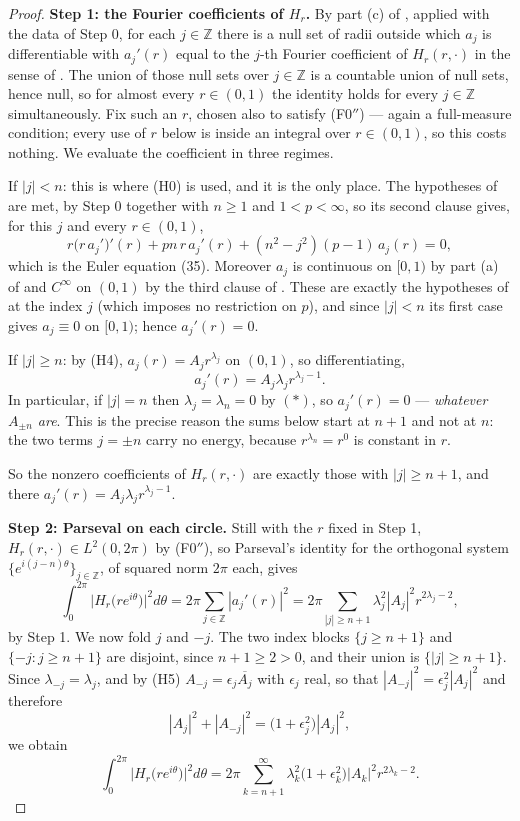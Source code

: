 \begin{proof}
\medskip\noindent\textbf{Step 1: the Fourier coefficients of $H_r$.}
By part (c) of , applied with the data of
Step 0, for each $j\in\mathbb{Z}$ there is a null set of radii outside which
$a_j$ is differentiable with $a_j'(r)$ equal to the $j$-th Fourier coefficient
of $H_r(r,\cdot)$ in the sense of .  The union of
those null sets over $j\in\mathbb{Z}$ is a countable union of null sets, hence
null, so for almost every $r\in(0,1)$ the identity holds for every
$j\in\mathbb{Z}$ simultaneously.  Fix such an $r$, chosen also to satisfy
(F0$''$) --- again a full-measure condition; every use of $r$ below is inside
an integral over $r\in(0,1)$, so this costs nothing.
We evaluate the coefficient in three regimes.

If $|j|<n$: this is where (H0) is used, and it is the only place.  The
hypotheses of  are met, by Step 0 together with
$n\ge1$ and $1<p<\infty$, so its second clause gives,
for this $j$ and every $r\in(0,1)$,
\[
  r\bigl(r\,a_j'\bigr)'(r)+pn\,r\,a_j'(r)+(n^2-j^2)(p-1)\,a_j(r)=0,
\]
which is the Euler equation (35).  Moreover $a_j$ is continuous on $[0,1)$ by
part (a) of  and $C^\infty$ on $(0,1)$ by the
third clause of .  These are exactly the hypotheses of
 at the index $j$ (which imposes no restriction on
$p$), and since $|j|<n$ its first case gives $a_j\equiv0$ on $[0,1)$; hence
$a_j'(r)=0$.

If $|j|\ge n$: by (H4), $a_j(r)=A_jr^{\lambda_j}$ on $(0,1)$, so
differentiating,
\[
  a_j'(r)=A_j\lambda_jr^{\lambda_j-1}.
\]
In particular, if $|j|=n$ then $\lambda_j=\lambda_n=0$ by $(\ast)$, so
$a_j'(r)=0$ --- \emph{whatever $A_{\pm n}$ are}.  This is the precise reason the
sums below start at $n+1$ and not at $n$: the two terms $j=\pm n$ carry no
energy, because $r^{\lambda_n}=r^0$ is constant in $r$.

So the nonzero coefficients of $H_r(r,\cdot)$ are exactly those with
$|j|\ge n+1$, and there $a_j'(r)=A_j\lambda_jr^{\lambda_j-1}$.

\medskip\noindent\textbf{Step 2: Parseval on each circle.}  Still with the
$r$ fixed in Step 1, $H_r(r,\cdot)\in L^2(0,2\pi)$ by (F0$''$), so Parseval's
identity for the orthogonal system
$\{e^{i(j-n)\theta}\}_{j\in\mathbb{Z}}$, of squared norm $2\pi$ each, gives
\[
  \int_0^{2\pi}\bigl|H_r\bigl(re^{i\theta}\bigr)\bigr|^2d\theta
  =2\pi\sum_{j\in\mathbb{Z}}|a_j'(r)|^2
  =2\pi\sum_{|j|\ge n+1}\lambda_j^2|A_j|^2r^{2\lambda_j-2},
\]
by Step 1.  We now fold $j$ and $-j$.  The two index blocks
$\{j\ge n+1\}$ and $\{-j:j\ge n+1\}$ are disjoint, since $n+1\ge2>0$, and
their union is $\{|j|\ge n+1\}$.  Since $\lambda_{-j}=\lambda_j$, and by (H5)
$A_{-j}=\epsilon_j\overline{A_j}$ with $\epsilon_j$ real, so that
$|A_{-j}|^2=\epsilon_j^2|A_j|^2$ and therefore
\[
  |A_j|^2+|A_{-j}|^2=\bigl(1+\epsilon_j^2\bigr)|A_j|^2 ,
\]
we obtain
\begin{equation}\tag{P}
  \int_0^{2\pi}\bigl|H_r\bigl(re^{i\theta}\bigr)\bigr|^2d\theta
  =2\pi\sum_{k=n+1}^{\infty}\lambda_k^2\bigl(1+\epsilon_k^2\bigr)|A_k|^2
    r^{2\lambda_k-2}.
\end{equation}


\end{proof}
